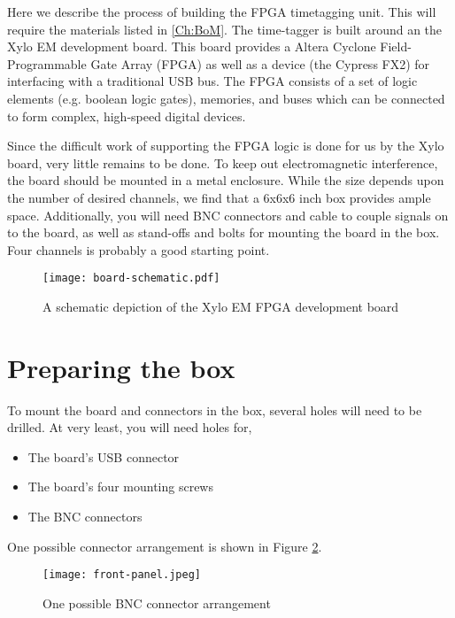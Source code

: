 Here we describe the process of building the FPGA timetagging
unit. This will require the materials listed in \ref{Ch:BoM}.  The
time-tagger is built around an the Xylo EM development board. This
board provides a Altera Cyclone Field-Programmable Gate Array (FPGA)
as well as a device (the Cypress FX2) for interfacing with a
traditional USB bus. The FPGA consists of a set of logic elements
(e.g. boolean logic gates), memories, and buses which can be connected
to form complex, high-speed digital devices.

Since the difficult work of supporting the FPGA logic is done for us
by the Xylo board, very little remains to be done. To keep out
electromagnetic interference, the board should be mounted in a metal
enclosure. While the size depends upon the number of desired channels,
we find that a 6x6x6 inch box provides ample space. Additionally, you
will need BNC connectors and cable to couple signals on to the board,
as well as stand-offs and bolts for mounting the board in the
box. Four channels is probably a good starting point.

\begin{figure}
  \center
  \texttt{[image: board-schematic.pdf]}
  \caption{A schematic depiction of the Xylo EM FPGA development board}
  \label{fig:board-schematic}
\end{figure}

\section{Preparing the box}

To mount the board and connectors in the box, several holes will need
to be drilled. At very least, you will need holes for,

\begin{itemize}
  \item The board's USB connector
  \item The board's four mounting screws 
  \item The BNC connectors
\end{itemize}

One possible connector arrangement is shown in Figure
\ref{fig:front-panel}.

\begin{figure}
  \center
  \texttt{[image: front-panel.jpeg]}
  \caption{One possible BNC connector arrangement}
  \label{fig:front-panel}
\end{figure}

